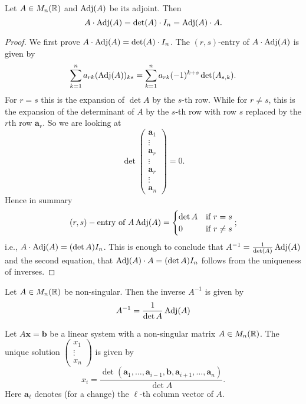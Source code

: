 \documentclass[10pt, a4paper]{article}
\newcommand{\mbf}[1]{\mathbf{#1}}
\begin{document}
\begin{proposition}
    Let $A \in M_n(\mathbb{R})$ and $\operatorname{Adj}(A)$ be its adjoint.
    Then
    \[
    A \cdot \operatorname{Adj}(A) = \det(A) \cdot I_n = \operatorname{Adj}(A) \cdot A.
    \]
    \begin{proof}
        We first prove $A \cdot \operatorname{Adj}(A) = \det(A) \cdot I_n$.
        The $(r, s)$-entry of $A \cdot \operatorname{Adj}(A)$ is given by
        \[
        \sum_{k = 1}^{n}a_{rk}(\operatorname{Adj}(A))_{ks} = \sum_{k = 1}^{n}a_{rk}(-1) ^ {k + s}\det(A_{s, k}).
        \]
        For $r = s$ this is the expansion of $\det A$ by the $s$-th row.
        While for $r \neq s$,
        this is the expansion of the determinant of $A$ by the $s$-th row with row $s$ replaced by the $r$th row $\mbf{a}_r$.
        So we are looking at
        \[
        \det\begin{pmatrix}
            \mbf{a}_1 \\ \vdots \\ \mbf{a}_r \\ \vdots \\ \mbf{a}_r \\ \vdots \\ \mbf{a}_n
        \end{pmatrix} = 0.
        \]
        Hence in summary
        \[
        (r, s)-\text{entry of } A\operatorname{Adj}(A) = \begin{cases}
            \det A &\text{if } r = s \\
            0 &\text{if } r \neq s
        \end{cases};
        \]
        i.e., $A \cdot \operatorname{Adj}(A) = (\det A)I_n$.
        This is enough to conclude that $A ^ {-1} = \frac{1}{\det(A)}\operatorname{Adj}(A)$ and the second equation,
        that $\operatorname{Adj}(A) \cdot A = (\det A)I_n$ follows from the uniqueness of inverses.
    \end{proof}
\end{proposition}

\begin{theorem}\label{pre_linalg_thm_invbyadjmatr}
    Let $A \in M_n(\mathbb{R})$ be non-singular.
    Then the inverse $A ^ {-1}$ is given by
    \[
    A ^ {-1} = \frac{1}{\det A}\operatorname{Adj}(A)
    \]
\end{theorem}

\begin{theorem}\label{pre_linalg_thm_cramersrulepre_linalg_thm_cramersrule}
    Let $A\mbf{x} = \mbf{b}$ be a linear system with a non-singular matrix $A \in M_n(\mathbb{R})$.
    The unique solution $\begin{pmatrix}
        x_1 \\ \vdots \\ x_n
    \end{pmatrix}$ is given by
    \[
    x_i = \frac{\det(\mbf{a}_1, \dotsc, \mbf{a}_{i - 1}, \mbf{b}, \mbf{a}_{i + 1}, \dotsc, \mbf{a}_n)}{\det A}.
    \]
    Here $\mbf{a}_\ell$ denotes (for a change) the $\ell$-th column vector of $A$.
\end{theorem}
\end{document}
